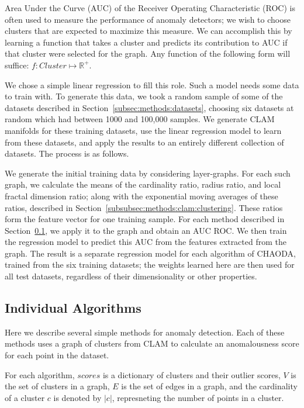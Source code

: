Area Under the Curve (AUC) of the Receiver Operating Characteristic (ROC) is often used to measure the performance of anomaly detectors;
we wish to choose clusters that are expected to maximize this measure.
We can accomplish this by learning a function that takes a cluster and predicts its contribution to AUC if that cluster were selected for the graph.
Any function of the following form will suffice: $f: Cluster \mapsto \mathbb{R}^+$.


We chose a simple linear regression to fill this role.
Such a model needs some data to train with.
To generate this data, we took a random sample of some of the datasets described in Section~\ref{subsec:methods:datasets}, choosing six datasets at random which had between 1000 and 100,000 samples.
We generate CLAM manifolds for these training datasets, use the linear regression model to learn from these datasets, and apply the results to an entirely different collection of datasets. The process is as follows.

We generate the initial training data by considering layer-graphs.
For each such graph, we calculate the means of the cardinality ratio, radius ratio, and local fractal dimension ratio;
along with the exponential moving averages of these ratios, described in Section~\ref{subsubsec:methods:clam:clustering}.
These ratios form the feature vector for one training sample.
For each method described in Section~\ref{subsec:methods:individual-algorithms}, we apply it to the graph and obtain an AUC ROC\@.
We then train the regression model to predict this AUC from the features extracted from the graph.
The result is a separate regression model for each algorithm of CHAODA, trained from the six training datasets; the weights learned here are then used for all test datasets, regardless of their dimensionality or other properties.


\subsection{Individual Algorithms}\label{subsec:methods:individual-algorithms}

Here we describe several simple methods for anomaly detection.
Each of these methods uses a graph of clusters from CLAM to calculate an anomalousness score for each point in the dataset.

For each algorithm, $scores$ is a dictionary of clusters and their outlier scores,
$V$ is the set of clusters in a graph,
$E$ is the set of edges in a graph, and
the cardinality of a cluster $c$ is denoted by $|c|$, represneting the number of points in a cluster.

